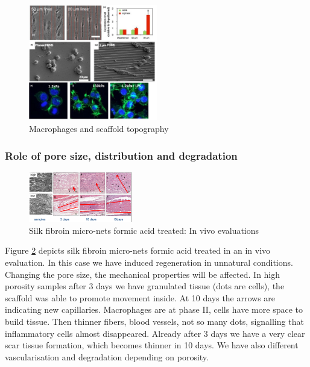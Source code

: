 		\begin{figure}[ht]
			\centering
			\includegraphics[width=0.5\textwidth]{topo}
			\caption{Macrophages and scaffold topography\label{fig:topo}}
		\end{figure}

		\subsubsection{Role of pore size, distribution and degradation}

		\begin{figure}[ht]
			\centering
			\includegraphics[width=0.4\textwidth]{silk}
			\caption{\label{fig:silk}Silk fibroin micro-nets formic acid treated: In vivo evaluations}
		\end{figure}

		Figure \ref{fig:silk} depicts silk fibroin micro-nets formic acid treated in an in vivo evaluation.
		In this case we have induced regeneration in unnatural conditions.
		Changing the pore size, the mechanical properties will be affected.
		In high porosity samples after 3 days we have granulated tissue (dots are cells), the scaffold was able to promote movement inside.
		At 10 days the arrows are indicating new capillaries.
		Macrophages are at phase II, cells have more space to build tissue.
		Then thinner fibers, blood vessels, not so many dots, signalling that inflammatory cells almost disappeared.
		Already after 3 days we have a very clear scar tissue formation, which becomes thinner in 10 days.
		We have also different vascularisation and degradation depending on porosity.

